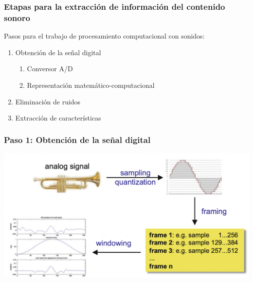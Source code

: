 \documentclass[
10pt, %
aspectratio=169, %
]{beamer}
\begin{document}
	\begin{frame}
		
		\frametitle{Etapas para la extracción de información del contenido sonoro}
		
		Pasos para el trabajo de procesamiento computacional con sonidos:
		\begin{enumerate}
			\item Obtención de la señal digital
			\begin{enumerate}[label=1.\arabic*.]
				\item Conversor A/D
				\item Representación matemático-computacional
			\end{enumerate}
			\item Eliminación de ruidos
			\item Extracción de características
		\end{enumerate}
		
	\end{frame}
	
	\begin{frame}
		
		\frametitle{Paso 1: Obtención de la señal digital}
		
		\centering
		\includegraphics[scale=0.6]{paso1.png}
		
		
	\end{frame}
	
\end{document}
